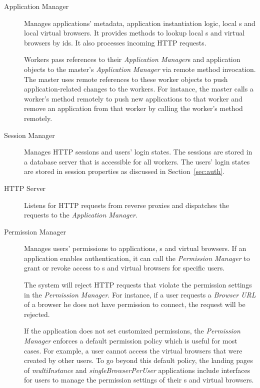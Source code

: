 \begin{description}

\item[Application Manager] Manages applications' metadata, application instantiation
logic, local \appins{}s
and local virtual browsers. It provides methods to lookup local \appins{}s and virtual
browsers by ids. It also processes incoming HTTP requests.

Workers pass references to their \emph{Application Manager}s and application objects to
the master's \emph{Application Manager} via remote method invocation.  The
master uses remote references to these worker
objects to push application-related changes to the  workers.  For instance,
the master calls  a worker's  method remotely to
push new applications to that worker and remove an application from that worker
by calling the worker's  method remotely.

\item[Session Manager] 
Manages HTTP sessions and users' login states. The sessions
are stored in a database server that is accessible for all workers. 
The users' login states are stored in session properties 
as discussed in Section~\ref{sec:auth}.


\item[HTTP Server] Listens for HTTP requests from reverse proxies and dispatches 
    the requests to the \emph{Application Manager}. 

\item[Permission Manager] 
Manages users' permissions to applications, \appins{}s and virtual browsers.
If an application enables authentication, it can call the \emph{Permission
Manager} to grant or revoke access to  \appins{}s and virtual
browsers for specific users. 

The system will reject HTTP requests that violate
the permission settings in the  \emph{Permission Manager}. For instance, if a
user requests a \emph{Browser URL} of a browser he does not have permission to
connect, the request will be rejected. 

If the application does not set
customized permissions, the \emph{Permission Manager} enforces a default
permission policy which is useful for most cases.  For example, a user
cannot access the virtual browsers that were created by other users.
To go beyond this default policy,
the landing pages of \emph{multiInstance} and \emph{singleBrowserPerUser}
applications include interfaces for users to manage the permission settings of
their \appins{}s and virtual browsers.

\end{description}


